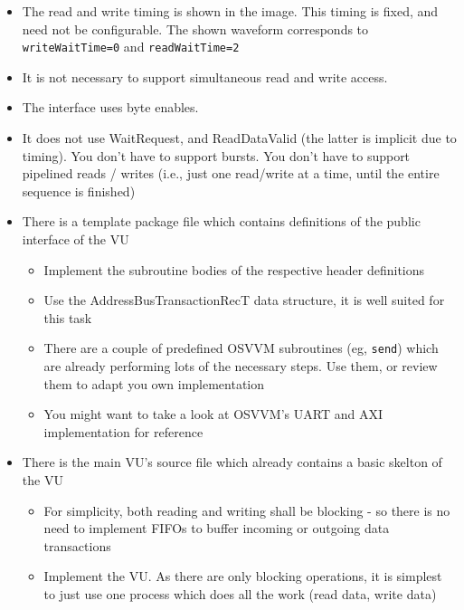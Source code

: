 \documentclass[12pt,epsf,makeidx,oneside]{book}
\begin{document}
  \begin{itemize}[noitemsep]
    \item The read and write timing is shown in the image. This timing is fixed, and need not be configurable. The shown waveform corresponds to {\tt writeWaitTime=0} and {\tt readWaitTime=2}
    \item It is not necessary to support simultaneous read and write access.
    \item The interface uses byte enables. 
    \item It does not use WaitRequest, and ReadDataValid (the latter is implicit due to timing). You don't have to support bursts. You don't have to support pipelined reads / writes (i.e., just one read/write at a time, until the entire sequence is finished)
    \item There is a template package file which contains definitions of the public interface of the VU
    \begin{itemize}[noitemsep]
      \item Implement the subroutine bodies of the respective header definitions
      \item Use the AddressBusTransactionRecT data structure, it is well suited for this task
      \item There are a couple of predefined OSVVM subroutines (eg, {\tt send}) which are already performing 
            lots of the necessary steps. Use them, or review them to adapt you own implementation
      \item You might want to take a look at OSVVM's UART and AXI implementation for reference
    \end{itemize}
    \item There is the main VU's source file which already contains a basic skelton of the VU
    \begin{itemize}[noitemsep]
      \item For simplicity, both reading and writing shall be blocking - so there is no need to implement FIFOs to buffer incoming or outgoing data transactions
      \item Implement the VU. As there are only blocking operations, it is simplest to just use one process which does all the work (read data, write data)
    \end{itemize}
  \end{itemize}
\end{document}
